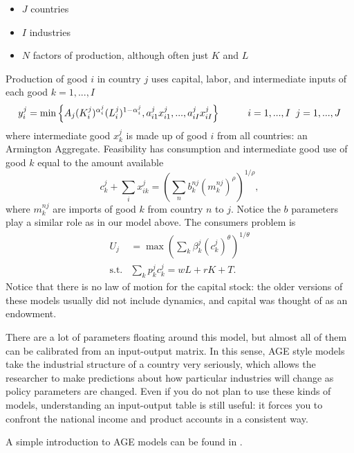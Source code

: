 \documentclass[11pt, pdftex]{article}
\begin{document}
\begin{itemize}
\item $J$ countries
\item $I$ industries
\item $N$ factors of production, although often just $K$ and $L$
\end{itemize}
Production of good $i$ in country $j$ uses capital, labor, and intermediate inputs of each good $k=1,...,I$
\begin{equation}
y_i^j=\min \left\{A_j(K_i^j)^{\alpha_i^j}(L_i^j)^{1-\alpha_i^j},a_{i1}^jx_{i1}^j,...,a_{iI}^jx_{iI}^j\right\} \hspace{1cm}i=1,...,I \hspace{0.2cm} j=1,...,J
\end{equation}
where intermediate good $x_{k}^j$ is made up of good $i$ from all countries: an Armington Aggregate.  Feasibility has consumption and intermediate good use of good $k$ equal to the amount available
\begin{equation}
c_k^j+\sum_ix_{ik}^j=\left(\sum_n b_k^{nj} (m_k^{nj})^{\rho}\right)^{1/\rho},
\end{equation}
where $m_k^{nj}$ are imports of good $k$ from country $n$ to $j$. Notice the $b$ parameters play a similar role as in our model above.
The consumers problem is
\begin{align}
U_j&=\max \left(\sum_k \beta_k^{j} (c_k^{j})^{\theta}\right)^{1/\theta}\\
\text{s.t.} & \sum_k p_k^j c_k^{j} = wL + rK+T.
\end{align}
Notice that there is no law of motion for the capital stock: the older versions of these models usually did not include dynamics, and capital was thought of as an endowment.

There are a lot of parameters floating around this model, but almost all of them can be calibrated from an input-output matrix.  In this sense, AGE style models take the industrial structure of a country very seriously, which allows the researcher to make predictions about how particular industries will change as policy parameters are changed.  Even if you do not plan to use these kinds of models, understanding an input-output table is still useful: it forces you to confront the national income and product accounts in a consistent way.

A simple introduction to AGE models can be found in \citet{kehoeKehoePrimer}.

\setlength{\parskip}{0.0cm}
\printbibliography
\end{document}
